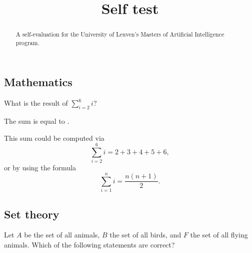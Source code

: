 \documentclass{ximera}
\title{Self test}
\begin{document}
\begin{abstract}
A self-evaluation for the University of Leuven's Masters of Artificial
Intelligence program.
\end{abstract}
\maketitle

\subsection*{Mathematics}

\begin{question}
What is the result of $\sum_{i=2}^6 i$?
\begin{solution}
The sum is equal to .
\end{solution}
This sum could be computed via
\[
\sum_{i=2}^6 i = 2 + 3 + 4 + 5 + 6,
\]
or by using the formula
\[
\sum_{i=1}^n i = \frac{n(n+1)}{2}.
\]
\end{question}

\subsection*{Set theory}

\begin{question}
Let $A$ be the set of all animals, $B$ the set of all birds, and $F$
the set of all flying animals. Which of the following statements are correct?
\begin{solution}
\begin{multiple-choice}
\end{multiple-choice}
\end{solution}
\end{question}
\end{document}
